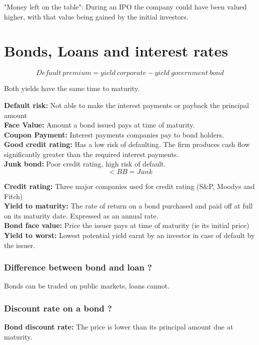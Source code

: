 \documentclass[11pt]{scrartcl} %
\begin{document}
"Money left on the table": During an IPO the company could have been valued higher, with that value being gained by the initial investors.

\section{Bonds, Loans and interest rates}

\[ Default\:premium = yield\:corporate - yield\:government\:bond \]

Both yields have the same time to maturity.

\textbf{Default risk:} Not able to make the interest payments or payback the principal amount\\
\textbf{Face Value:} Amount a bond issued pays at time of maturity.\\
\textbf{Coupon Payment:} Interest payments companies pay to bond holders.\\
\textbf{Good credit rating:} Has a low risk of defaulting. The firm produces cash flow significantly greater than the required interest payments.\\
\textbf{Junk bond:} Poor credit rating, high risk of default.\\

\[ < BB = Junk \]

\textbf{Credit rating:} Three major companies used for credit rating (S\&P, Moodys and Fitch)\\
\textbf{Yield to maturity:} The rate of return on a bond purchased and paid off at full on its maturity date. Expressed as an annual rate. \\
\textbf{Bond face value:} Price the issuer pays at time of maturity (ie its initial price)\\
\textbf{Yield to worst:} Lowest potential yield earnt by an investor in case of default by the issuer.

\subsubsection{Difference between bond and loan ?}

Bonds can be traded on public markets, loans cannot.

\subsubsection{Discount rate on a bond ?}

\textbf{Bond discount rate:} The price is lower than its principal amount due at maturity.\\
\end{document}
